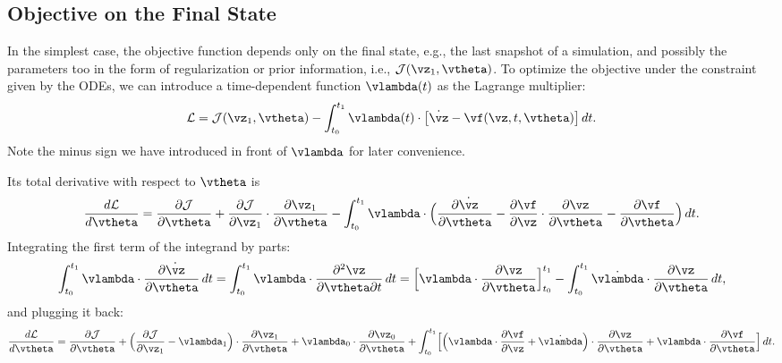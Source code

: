 \documentclass[modern, dvipsnames]{aastex631}
\renewcommand{\d}{d}
\newcommand{\p}{\partial}
\newcommand{\cJ}{\mathcal{J}}
\newcommand{\cL}{\mathcal{L}}
\begin{document}
\vspace{1em}
\subsection{Objective on the Final State}

In the simplest case, the objective function depends only on the final
state, e.g., the last snapshot of a simulation, and possibly the
parameters too in the form of regularization or prior information, i.e.,
$\cJ(\vz_1, \vtheta)$.
To optimize the objective under the constraint given by the ODEs, we can
introduce a time-dependent function $\vlambda(t)$ as the Lagrange
multiplier:
%
\begin{equation}
\cL = \cJ(\vz_1, \vtheta)
- \int_{t_0}^{t_1} \vlambda(t)
  \cdot \bigl[ \dot\vz - \vf(\vz, t, \vtheta) \bigr] \, \d t.
\end{equation}
%
Note the minus sign we have introduced in front of $\vlambda$ for later
convenience.

Its total derivative with respect to $\vtheta$ is
%
\begin{equation}
\frac{\d\cL}{\d\vtheta}
= \frac{\p\cJ}{\p\vtheta}
+ \frac{\p\cJ}{\p\vz_1} \cdot \frac{\p\vz_1}{\p\vtheta}
- \int_{t_0}^{t_1} \vlambda
  \cdot \Bigl( \frac{\p\dot\vz}{\p\vtheta}
    - \frac{\p\vf}{\p\vz} \cdot \frac{\p\vz}{\p\vtheta}
    - \frac{\p\vf}{\p\vtheta} \Bigr) \, \d t.
\end{equation}
%
Integrating the first term of the integrand by parts:
%
\begin{equation}
\int_{t_0}^{t_1} \vlambda \cdot \frac{\p\dot\vz}{\p\vtheta} \, \d t
= \int_{t_0}^{t_1} \vlambda \cdot \frac{\p^2\vz}{\p\vtheta\p t} \, \d t
= \Bigl[ \vlambda \cdot \frac{\p\vz}{\p\vtheta} \Bigr]_{t_0}^{t_1}
- \int_{t_0}^{t_1} \dot \vlambda \cdot \frac{\p\vz}{\p\vtheta} \, \d t,
\end{equation}
%
and plugging it back:
%
\begin{equation}
\frac{\d\cL}{\d\vtheta}
= \frac{\p\cJ}{\p\vtheta}
+ \Bigl( \frac{\p\cJ}{\p\vz_1} - \vlambda_1 \Bigr)
  \cdot \frac{\p\vz_1}{\p\vtheta}
+ \vlambda_0 \cdot \frac{\p\vz_0}{\p\vtheta}
+ \int_{t_0}^{t_1} \Bigl[
  \Bigl( \vlambda \cdot \frac{\p\vf}{\p\vz} + \dot\vlambda \Bigr)
  \cdot \frac{\p\vz}{\p\vtheta}
  + \vlambda \cdot \frac{\p\vf}{\p\vtheta} \Bigr] \, \d t.
\end{equation}
\end{document}

